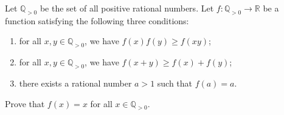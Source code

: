 Let $\mathbb Q_{>0}$ be the set of all positive rational numbers. Let $f:\mathbb Q_{>0}\to\mathbb R$ be a function satisfying the following three conditions:

\begin{enumerate}[label = (\roman*)]
	\item for all $x,y\in\mathbb Q_{>0}$,  we have $f(x)f(y)\geq f(xy)$;

	\item for all $x,y\in\mathbb Q_{>0}$,  we have $f(x+y)\geq f(x)+f(y)$;

	\item there exists a rational number $a>1$ such that $f(a)=a$.
\end{enumerate}

Prove that $f(x)=x$ for all $x\in\mathbb Q_{>0}$.
